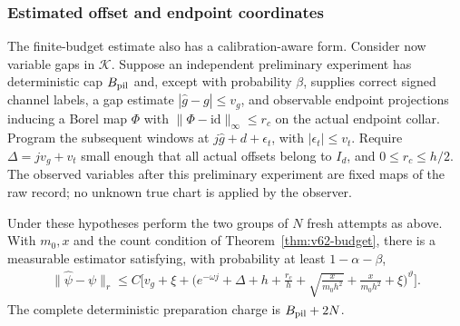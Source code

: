 \subsubsection*{Estimated offset and endpoint coordinates}
The finite-budget estimate also has a calibration-aware form.  Consider
now variable gaps in $\mathcal K$.  Suppose an independent preliminary
experiment has deterministic cap $B_{\rm pil}$ and, except with probability
$\beta$, supplies correct signed channel labels, a gap estimate
$|\widehat g-g|\le v_g$, and observable endpoint projections inducing a
Borel map $\Phi$ with $\|\Phi-\mathrm{id}\|_\infty\le r_c$ on the
actual endpoint collar.  Program the subsequent windows at
$j\widehat g+d+\epsilon_t$, with $|\epsilon_t|\le v_t$.
Require $\Delta=jv_g+v_t$ small enough that all actual offsets belong
to $I_d$, and $0\le r_c\le h/2$.  The observed variables after this
preliminary experiment are fixed maps of the raw record; no unknown true
chart is applied by the observer.

\begin{corollary}
\label{cor:v62-calibration}
Under these hypotheses perform the two groups of $N$ fresh attempts as
above.  With $m_0,x$ and the count condition of
Theorem~\ref{thm:v62-budget}, there is a measurable estimator satisfying,
with probability at least $1-\alpha-\beta$,
\begin{align}
 \|\widehat\psi-\psi\|_r
 \le C\biggl[ v_g+\xi+
 \biggl(e^{-\omega j}+\Delta+h+\frac{r_c}{h}
       +\sqrt{\frac{x}{m_0h^2}}+
                \frac{x}{m_0h^2}+\xi\biggr)^\vartheta\biggr].
 \label{eq:v62-calibration-bound}
\end{align}
The complete deterministic preparation charge is $B_{\rm pil}+2N$.
\end{corollary}

